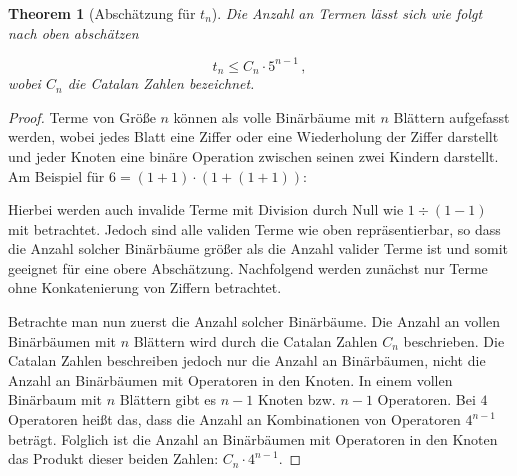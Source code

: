\documentclass{article}
\newtheorem{theorem}{Theorem}[section]
\theoremstyle{nonumberplain}
\newtheorem{proof}{Beweis}
\begin{document}
\begin{theorem}[Abschätzung für \(t_n\)]\label{theorem:tn_bound}
    Die Anzahl an Termen lässt sich wie folgt nach oben abschätzen

        \[t_n \leq C_n \cdot 5^{n-1}\,,\]
     wobei \(C_n\) die Catalan Zahlen bezeichnet.
\end{theorem}
\begin{proof}
    Terme von Größe \(n\) können als volle Binärbäume mit \(n\) Blättern aufgefasst werden, wobei jedes Blatt eine Ziffer oder eine Wiederholung der Ziffer darstellt und jeder Knoten eine binäre Operation zwischen seinen zwei Kindern darstellt.
    Am Beispiel für \(6 = (1+1)\cdot(1+(1+1))\):
    \begin{center}
    \end{center}
    Hierbei werden auch invalide Terme mit Division durch Null wie \(1 \div (1-1)\) mit betrachtet.
    Jedoch sind alle validen Terme wie oben repräsentierbar, so dass die Anzahl solcher Binärbäume größer als die Anzahl valider Terme ist und somit geeignet für eine obere Abschätzung.
    Nachfolgend werden zunächst nur Terme ohne Konkatenierung von Ziffern betrachtet.

    Betrachte man nun zuerst die Anzahl solcher Binärbäume.
    Die Anzahl an vollen Binärbäumen mit \(n\) Blättern wird durch die Catalan Zahlen \(C_n\) beschrieben.
    Die Catalan Zahlen beschreiben jedoch nur die Anzahl an Binärbäumen, nicht die Anzahl an Binärbäumen mit Operatoren in den Knoten.
    In einem vollen Binärbaum mit \(n\) Blättern gibt es \(n-1\) Knoten bzw. \(n-1\) Operatoren.
    Bei \(4\) Operatoren heißt das, dass die Anzahl an Kombinationen von Operatoren \(4^{n-1}\) beträgt.
    Folglich ist die Anzahl an Binärbäumen mit Operatoren in den Knoten das Produkt dieser beiden Zahlen: \(C_n \cdot 4^{n-1}\).


\end{proof}
\end{document}
